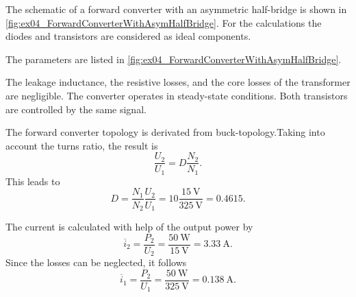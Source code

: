

The schematic of a forward converter with an asymmetric half-bridge is shown in \autoref{fig:ex04_ForwardConverterWithAsymHalfBridge}. 
For the calculations the diodes and transistors are considered as ideal components.



The parameters are listed in \autoref{fig:ex04_ForwardConverterWithAsymHalfBridge}.


\FloatBarrier
The leakage inductance, the resistive losses, and the core losses of the transformer are negligible. 
The converter operates in steady-state conditions. Both transistors are controlled by the same signal.

\begin{solutionblock}
    The forward converter topology is derivated from buck-topology.Taking into account the turns ratio, the result is
    \begin{equation}
        \frac{U_\mathrm{2}}{U_\mathrm{1}}=D\frac{N_\mathrm{2}}{N_\mathrm{1}}.
        \label{eq:ex04voltageratioforwardconverter}
    \end{equation}
    This leads to
    \begin{equation}
        D=\frac{N_\mathrm{1}}{N_\mathrm{2}}\frac{U_\mathrm{2}}{U_\mathrm{1}}=10\frac{\SI{15}{\volt}}{\SI{325}{\volt}}=0.4615.
    \end{equation}
\end{solutionblock}

\begin{solutionblock}
    The current is calculated with help of the output power by
    \begin{equation}
        \overline{i}_\mathrm{2}=\frac{P_\mathrm{2}}{U_\mathrm{2}}=\frac{\SI{50}{\watt}}{\SI{15}{\volt}}=\SI{3.33}{\ampere}.
        \label{eq:ex04averageoutputcurrent}
    \end{equation}
    Since the losses can be neglected, it follows
    \begin{equation}
        \overline{i}_\mathrm{1}=\frac{P_\mathrm{2}}{U_\mathrm{1}}=\frac{\SI{50}{\watt}}{\SI{325}{\volt}}=\SI{0.138}{\ampere}.
    \end{equation}
\end{solutionblock}


